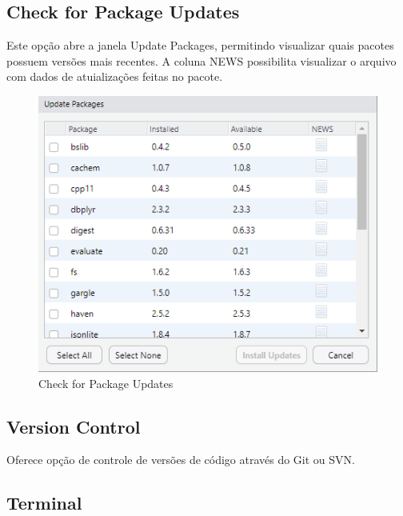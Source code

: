 \documentclass[
  letterpaper,
  DIV=11,
  numbers=noendperiod]{scrreprt}
\begin{document}
\hypertarget{check-for-package-updates}{%
\subsection{Check for Package Updates}\label{check-for-package-updates}}

Este opção abre a janela Update Packages, permitindo visualizar quais
pacotes possuem versões mais recentes. A coluna NEWS possibilita
visualizar o arquivo com dados de atuializações feitas no pacote.

\begin{figure}

{\centering \includegraphics{./images/rstudio/menu_tools_update_pkgs.png}

}

\caption{\label{fig-rstudio-menu-update-pkgs}Check for Package Updates}

\end{figure}

\hypertarget{version-control}{%
\subsection{Version Control}\label{version-control}}

Oferece opção de controle de versões de código através do Git ou SVN.

\hypertarget{terminal}{%
\subsection{Terminal}\label{terminal}}
\end{document}
